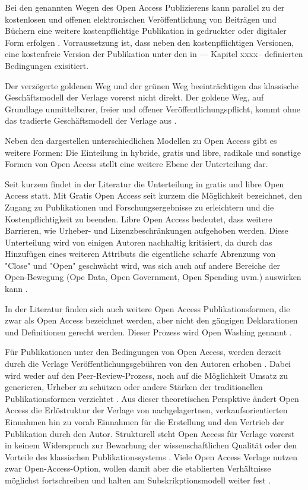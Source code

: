 Bei den genannten Wegen des Open Access Publizierens kann parallel zu der kostenlosen und offenen elektronischen Veröffentlichung von Beiträgen und Büchern eine weitere kostenpflichtige Publikation in gedruckter oder digitaler Form erfolgen \cite{suchen}. Vorraussetzung ist, dass neben den kostenpflichtigen Versionen, eine kostenfreie Version der Publikation unter den in --- Kapitel xxxx-- definierten Bedingungen exisitiert.

Der verzögerte goldenen Weg und der grünen Weg beeinträchtigen das klassische Geschäftsmodell der Verlage vorerst nicht direkt. Der goldene Weg, auf Grundlage unmittelbarer, freier und offener Veröffentlichungspflicht, kommt ohne das tradierte Geschäftsmodell der Verlage aus \cite{lewis_2012_inevitability}.

Neben den dargestellen unterschiedlichen Modellen zu Open Access gibt es weitere Formen: Die Einteilung in hybride, gratis und libre, radikale und sonstige Formen von Open Access stellt eine weitere Ebene der Unterteilung dar. 

Seit kurzem findet in der Literatur die Unterteilung in gratis und libre Open Access statt. Mit Gratis Open Access seit kurzem die Möglichkeit bezeichnet, den Zugang zu Publikationen und Forschungsergebnisse zu erleichtern und die Kostenpflichtigkeit zu beenden. Libre Open Access bedeutet, dass weitere Barrieren, wie Urheber- und Lizenzbeschränkungen aufgehoben werden. \cite{Adema_2014_open_access} Diese Unterteilung wird von einigen Autoren nachhaltig kritisiert, da durch das Hinzufügen eines weiteren Attributs die eigentliche scharfe Abrenzung von "Close" und "Open" geschwächt wird, was sich auch auf andere Bereiche der Open-Bewegung (Ope Data, Open Government, Open Spending uvm.) auswirken kann \cite{suchen}. 

In der Literatur \cite{suchen} finden sich auch weitere Open Access Publikationsformen, die zwar als Open Access bezeichnet werden, aber nicht den gängigen Deklarationen \cite{boai_2012} und Definitionen gerecht werden. Dieser Prozess wird Open Washing genannt \cite{suchen}. 

Für Publikationen unter den Bedingungen von Open Access, werden derzeit durch die Verlage Veröffentlichungsgebühren von den Autoren erhoben \cite{suchen}. Dabei wird weder auf den Peer-Review-Prozess, noch auf die Möglichkeit Umsatz zu generieren, Urheber zu schützen oder andere Stärken der traditionellen Publikationsformen verzichtet \cite{albert_2006_open_implications} \cite{Open_Access_net_2009}. Aus dieser theoretischen Perspktive ändert Open Access die Erlöstruktur der Verlage von nachgelagertnen, verkaufsorientierten Einnahmen hin zu vorab Einnahmen für die Erstellung und den Vertrieb der Publikation durch den Autor. Strukturell steht Open Access für Verlage vorerst in keinem Widerspruch zur Bewarhung der wissenschaftlichen Qualität oder den Vorteile des klassischen Publikationssystems \cite{Suber_2002}. Viele Open Access Verlage nutzen zwar Open-Access-Option, wollen damit aber die etablierten Verhältnisse möglichst fortschreiben und halten am Subskrikptionsmodell weiter fest \cite{schmidt_2007_goldenen}.

